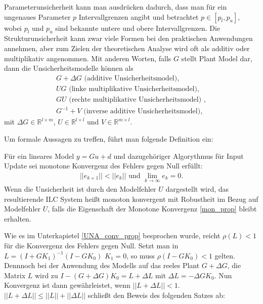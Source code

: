 Parameterunsicherheit kann man ausdrücken dadurch, dass man für ein ungenaues Parameter $p$ Intervallgrenzen angibt und betrachtet $p \in [p_l, p_u]$, wobei $p_l$ und $p_u$ sind bekannte untere und obere Intervallgrenzen. Die Strukturunsicherheit kann zwar viele Formen bei den praktischen Anwendungen annehmen, aber zum Zielen der theoretischen Analyse wird oft als additiv oder multiplikativ angenommen. Mit anderen Worten, falls $G$ stellt Plant Model dar, dann die Unsicherheitsmodelle können als
\begin{align}
G + \Delta G \text{ (additive Unsicherheitsmodel)}, \\
UG \text{ (linke multiplikative Unsicherheitsmodel)},\\
GU \text{ (rechte multiplikative Unsicherheitsmodel) }, \\ 
G^{-1} + V \text{ (inverse additive Unsicherheitsmodel)},
\end{align}
mit $\Delta G \in \mathbb{R}^{l \times m}$, $U \in \mathbb{R}^{l\times l}$ und $V \in \mathbb{R}^{m \times l}$. 

Um formale Aussagen zu treffen, führt man folgende Definition ein: 

\begin{defi}
	Für ein lineares Model $y = Gu + d$ und dazugehöriger Algorythmus für Input Update sei monotone Konvergenz des Fehlers gegen Null erfüllt: 
	\begin{align}
	||e_{k+1} || < ||e_k|| \text{ und } \lim_{k \to \infty} e_k = 0. \label{mon_prop}
	\end{align}
	Wenn die Unsicherheit ist durch den Modelfehler $U$ dargestellt wird, das resultierende ILC System heißt monoton konvergent mit Robustheit im Bezug auf Modelfehler $U$, falls die Eigenschaft der Monotone Konvergenz \ref{mon_prop} bleibt erhalten. 
\end{defi}

Wie es im Unterkapietel \ref{UNA_conv_prop} besprochen wurde, reicht $\rho(L) < 1$ für die Konvergenz des Fehlers gegen Null. Setzt man in $L = (I + GK_1)^{-1}(I - GK_0)$ $K_1 = 0$, so muss $\rho(I - GK_0) < 1$ gelten. Dennnoch bei der Anwendung des Modells auf das reeles Plant $G + \Delta G$, die Matrix $L$ wird zu $I - (G+ \Delta G)K_0 = L + \Delta L$ mit $\Delta L = - \Delta G K_0$. Nun Konvergenz ist dann gewährleistet, wenn $|| L + \Delta L|| < 1$. $||L + \Delta L || \leq ||L || + ||\Delta L||$ schließt den Beweis des folgenden Satzes ab: 

